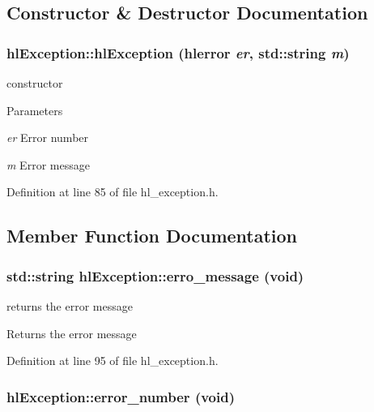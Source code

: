 \subsection{Constructor \& Destructor Documentation}
\hypertarget{classhl_exception_a7865e073d450fb1f139db18328d4b380}{
\subsubsection[{hlException}]{\setlength{\rightskip}{0pt plus 5cm}hlException::hlException ({\bf hlerror} {\em er}, \/  std::string {\em m})}}
\label{classhl_exception_a7865e073d450fb1f139db18328d4b380}


constructor 
\begin{DoxyParams}{Parameters}
\item[{\em er}]Error number \item[{\em m}]Error message \end{DoxyParams}


Definition at line 85 of file hl\_\-exception.h.

\subsection{Member Function Documentation}
\hypertarget{classhl_exception_ae3217dae99447bc3b4062ae6bc0d3326}{
\subsubsection[{erro\_\-message}]{\setlength{\rightskip}{0pt plus 5cm}std::string hlException::erro\_\-message (void)}}
\label{classhl_exception_ae3217dae99447bc3b4062ae6bc0d3326}


returns the error message \begin{DoxyReturn}{Returns}
the error message 
\end{DoxyReturn}


Definition at line 95 of file hl\_\-exception.h.\hypertarget{classhl_exception_a4bf028d62d1e53992701039bf55f6d15}{
\subsubsection[{error\_\-number}]{ hlException::error\_\-number (void)}}
\label{classhl_exception_a4bf028d62d1e53992701039bf55f6d15}


